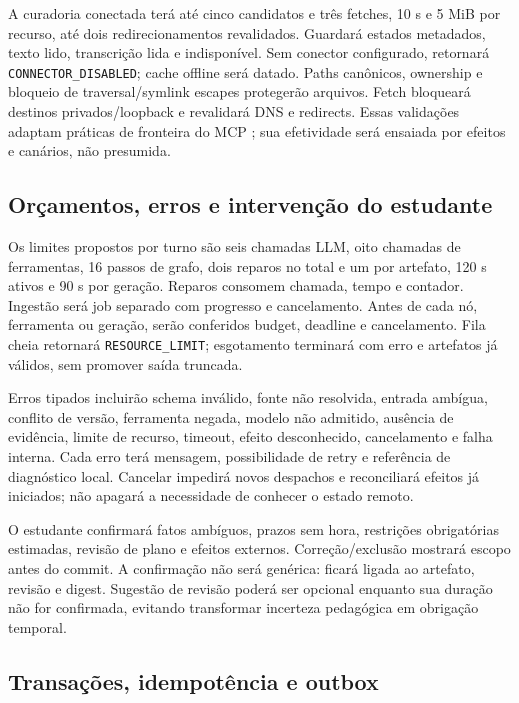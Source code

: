 \documentclass[12pt]{article}
\let\cite\citep
\newcommand{\code}[1]{\nolinkurl{#1}}
\begin{document}
A curadoria conectada terá até cinco candidatos e três fetches, 10 s e 5 MiB por recurso, até dois redirecionamentos revalidados. Guardará estados metadados, texto lido, transcrição lida e indisponível. Sem conector configurado, retornará \code{CONNECTOR_DISABLED}; cache offline será datado. Paths canônicos, ownership e bloqueio de traversal/symlink escapes protegerão arquivos. Fetch bloqueará destinos privados/loopback e revalidará DNS e redirects. Essas validações adaptam práticas de fronteira do MCP \cite{mcpsec}; sua efetividade será ensaiada por efeitos e canários, não presumida.

\subsection{Orçamentos, erros e intervenção do estudante}

Os limites propostos por turno são seis chamadas LLM, oito chamadas de ferramentas, 16 passos de grafo, dois reparos no total e um por artefato, 120 s ativos e 90 s por geração. Reparos consomem chamada, tempo e contador. Ingestão será job separado com progresso e cancelamento. Antes de cada nó, ferramenta ou geração, serão conferidos budget, deadline e cancelamento. Fila cheia retornará \code{RESOURCE_LIMIT}; esgotamento terminará com erro e artefatos já válidos, sem promover saída truncada.

Erros tipados incluirão schema inválido, fonte não resolvida, entrada ambígua, conflito de versão, ferramenta negada, modelo não admitido, ausência de evidência, limite de recurso, timeout, efeito desconhecido, cancelamento e falha interna. Cada erro terá mensagem, possibilidade de retry e referência de diagnóstico local. Cancelar impedirá novos despachos e reconciliará efeitos já iniciados; não apagará a necessidade de conhecer o estado remoto.

O estudante confirmará fatos ambíguos, prazos sem hora, restrições obrigatórias estimadas, revisão de plano e efeitos externos. Correção/exclusão mostrará escopo antes do commit. A confirmação não será genérica: ficará ligada ao artefato, revisão e digest. Sugestão de revisão poderá ser opcional enquanto sua duração não for confirmada, evitando transformar incerteza pedagógica em obrigação temporal.

\subsection{Transações, idempotência e outbox}
\end{document}
